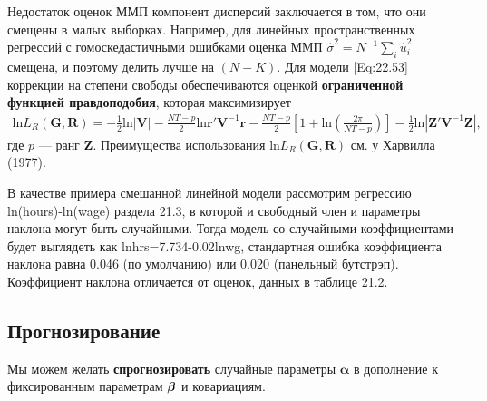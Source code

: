 Недостаток оценок ММП компонент дисперсий заключается в том, что они смещены в малых выборках. Например, для линейных пространственных регрессий с гомоскедастичными ошибками оценка ММП $\hat{\sigma}^2=N^{-1} \sum_i \hat{u}^2_i$ смещена, и поэтому делить лучше на $(N-K)$. Для модели \ref{Eq:22.53} коррекции на степени свободы обеспечиваются оценкой \textbf{ограниченной функцией правдоподобия}, которая максимизирует
\begin{align}
\mathrm{ln} L_R(\mathbf G, \mathbf R)=-\frac{1}{2} \mathrm{ln}|\mathbf V| - \frac{NT-p}{2} \mathrm{ln} \mathbf r' \mathbf V^{-1} \mathbf r - \frac{NT-p}{2} \left[ 1+ \mathrm{ln}(\frac{2\pi}{NT-p})\right]
-\frac{1}{2}\mathrm{ln}| \mathbf Z' \mathbf V^{-1} \mathbf Z|,
\nonumber
\end{align}
где  $p$  --- ранг $\mathbf Z$. Преимущества использования  $\mathrm{ln} L_R(\mathbf G, \mathbf R)$ см. у Харвилла (1977).

В качестве примера смешанной линейной модели рассмотрим регрессию ln(hours)-ln(wage) раздела 21.3, в которой и свободный член и параметры наклона могут быть случайными. Тогда модель со случайными коэффициентами будет выглядеть как lnhrs=7.734-0.02lnwg, стандартная ошибка коэффициента наклона равна 0.046 (по умолчанию) или 0.020 (панельный бутстрэп). Коэффициент наклона отличается от оценок, данных в таблице 21.2.

 \subsection{Прогнозирование}

Мы можем желать \textbf{спрогнозировать} случайные параметры $\bm\alpha$  в дополнение к фиксированным параметрам $\bm{\beta}$ и ковариациям.

